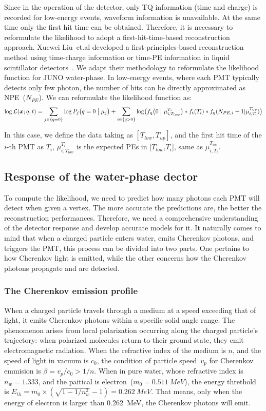Since in the operation of the detector, only TQ information (time and charge) is recorded for low-energy events, waveform information is unavailable. At the same time only the first hit time can be obtained. Therefore, it is necessary to reformulate the likelihood to adopt a first-hit-time-based reconstruction approach. Xuewei Liu~et.al developed a first-principles-based reconstruction method using time-charge information or time-PE information in liquid scintillator detectors~\cite{Liu:2024cxo}. We adapt their methodology to reformulate the likelihood function for JUNO water-phase. In low-energy events, where each PMT typically detects only few photon, the number of hits can be directly approximated as NPE~($N_{PE}$). We can reformulate the likelihood function as:
\begin{equation}
	\log \mathcal{L}(\boldsymbol{x};{q},{t})= \sum_{j \in \{q=0\}}\log P_j \bigl( q=0\bigm| \mu_j \bigr)+\sum_{i \in \{q>0\}} \log \bigl( f_{\mathrm{q}}\bigl( 0 \bigm| \mu_{i,T_{low}}^{T_i} \bigr) * f_{\mathrm{t}}(T_i) * f_{\mathrm{q}}(N_{PE,i}-1|\mu_{i,T_{i}}^{T_{up}}) \bigr)
\end{equation}

In this case, we define the data taking as $[T_{low},T_{up}]$, and the first hit time of the $i$-th PMT as $T_{i}$, $\mu_{i,T_{low}}^{T_i}$ is the expected PEs in [$T_{low}$,${T_i}$], same as $\mu_{i,T_{i}}^{T_{up}}$.

\subsection{Response of the water-phase dector}
To compute the likelihood, we need to predict how many photons each PMT will detect when given a vertex. The more accurate the predictions are, the better the reconstruction performances. Therefore, we need a comprehensive understanding of the detector response and develop accurate models for it.
It naturally comes to mind that when a charged particle enters water, emits Cherenkov photons, and triggers the PMT, this process can be divided into two parts. One pertains to how Cherenkov light is emitted, while the other concerns how the Cherenkov photons propagate and are detected.

\subsubsection{The Cherenkov emission profile}
When a charged particle travels through a medium at a speed exceeding that of light, it emits Cherenkov photons within a specific solid angle range. The phenomenon arises from local polarization occurring along the charged particle's trajectory: when polarized molecules return to their ground state, they emit electromagnetic radiation. When the refractive index of the medium is $n$, and the speed of light in vacuum is $c_0$, the condition of particle speed~$v_p$ for Cherenkov emmision is $\beta=v_p/c_0>1/n$. When in pure water, whose refractive index is $n_w=1.333$, and the paitical is electron~($m_0=\SI{0.511}{MeV}$), the energy threthold is $E_{th}=m_0\times(\sqrt{1-1/n_w^2}-1)=\SI{0.262}{MeV}$. That means, only when the energy of electron is larger than \SI{0.262}{MeV}, the Cherenkov photons will emit.

